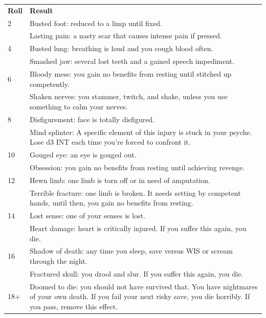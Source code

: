 \documentclass[twoside]{article}
\begin{document}
\begin{center}
\noindent\begin{tabular}{>{\centering\arraybackslash}p{}p{}}
\textbf{Roll}&\textbf{Result}\\
\rowcolor[gray]{0.75}2&Busted foot: reduced to a limp until fixed.\\
3&Lasting pain: a nasty scar that causes intense pain if pressed.\\
\rowcolor[gray]{0.75}4&Busted lung: breathing is loud and you cough blood often.\\
5&Smashed jaw: several lost teeth and a gained speech impediment.\\
\rowcolor[gray]{0.75}6&Bloody mess: you gain no benefits from resting until stitched up competently.\\
7&Shaken nerves: you stammer, twitch, and shake, unless you use something to calm your nerves.\\
\rowcolor[gray]{0.75}8&Disfigurement: face is totally disfigured.\\
9&Mind splinter: A specific element of this injury is stuck in your psyche. Lose d3 INT each time you're forced to confront it.\\
\rowcolor[gray]{0.75}10&Gouged eye: an eye is gouged out.\\
11&Obsession: you gain no benefits from resting until achieving revenge.\\
\rowcolor[gray]{0.75}12&Hewn limb: one limb is torn off or in need of amputation.\\
13&Terrible fracture: one limb is broken. It needs setting by competent hands, until then, you gain no benefits from resting.\\
\rowcolor[gray]{0.75}14&Lost sense: one of your senses is lost.\\
15&Heart damage: heart is critically injured. If you suffer this again, you die.\\
\rowcolor[gray]{0.75}16&Shadow of death: any time you sleep, save versus WIS or scream through the night.\\
17&Fractured skull: you drool and slur. If you suffer this again, you die.\\
\rowcolor[gray]{0.75}18+&Doomed to die: you should not have survived that. You have nightmares of your own death. If you fail your next risky save, you die horribly. If you pass, remove this effect.\\
\end{tabular}
\end{center}
\end{document}
